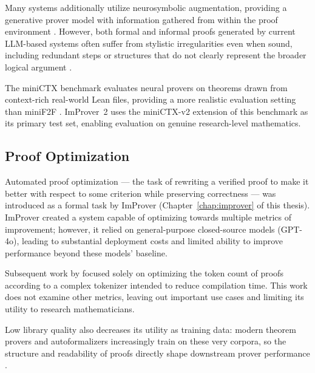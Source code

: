 Many systems additionally utilize neurosymbolic augmentation, providing a generative prover model with information gathered from within the proof environment \cite{leandojo, ImProver, GodelProver}. However, both formal and informal proofs generated by current LLM-based systems often suffer from stylistic irregularities even when sound, including redundant steps or structures that do not clearly represent the broader logical argument \cite{frieder2025datamathematicalcopilotsbetter}.

The miniCTX benchmark \cite{hu2024minictxneuraltheoremproving} evaluates neural provers on theorems drawn from context-rich real-world Lean files, providing a more realistic evaluation setting than miniF2F \cite{zheng2022miniff}. ImProver~2 uses the miniCTX-v2 extension of this benchmark as its primary test set, enabling evaluation on genuine research-level mathematics.

\subsection{Proof Optimization}
\label{sec:rw_optimization}

Automated proof optimization --- the task of rewriting a verified proof to make it better with respect to some criterion while preserving correctness --- was introduced as a formal task by ImProver \cite{ImProver} (Chapter~\ref{chap:improver} of this thesis). ImProver created a system capable of optimizing towards multiple metrics of improvement; however, it relied on general-purpose closed-source models (GPT-4o), leading to substantial deployment costs and limited ability to improve performance beyond these models' baseline.

Subsequent work by \cite{gu2025proofoptimizer} focused solely on optimizing the token count of proofs according to a complex tokenizer intended to reduce compilation time. This work does not examine other metrics, leaving out important use cases and limiting its utility to research mathematicians.

Low library quality also decreases its utility as training data: modern theorem provers and autoformalizers increasingly train on these very corpora, so the structure and readability of proofs directly shape downstream prover performance \cite{gu2025proofoptimizer}.


